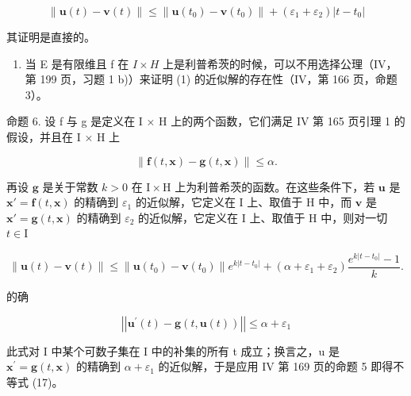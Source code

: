 \[
\left\| \mathbf {u} (t) - \mathbf {v} (t) \right\| \leqslant \left\| \mathbf {u} \left(t _ {0}\right) - \mathbf {v} \left(t _ {0}\right) \right\| + \left(\varepsilon_ {1} + \varepsilon_ {2}\right) | t - t _ {0} |
\]

其证明是直接的。

\begin{enumerate}
\def\labelenumi{\arabic{enumi})}
\setcounter{enumi}{1}
\tightlist
\item
  当 E 是有限维且 f 在 \(I \times H\) 上是利普希茨的时候，可以不用选择公理（IV，第 199 页，习题 1 b)）来证明 (1) 的近似解的存在性（IV，第 166 页，命题 3）。
\end{enumerate}

命题 6. 设 f 与 g 是定义在 I × H 上的两个函数，它们满足 IV 第 165 页引理 1 的假设，并且在 I × H 上

\[
\left\| \mathbf {f} (t, \mathbf {x}) - \mathbf {g} (t, \mathbf {x}) \right\| \leqslant \alpha .\tag{16}
\]

再设 \(\mathbf{g}\) 是关于常数 \(k > 0\) 在 \(\mathrm{I} \times \mathrm{H}\) 上为利普希茨的函数。在这些条件下，若 \(\mathbf{u}\) 是 \(\mathbf{x}' = \mathbf{f}(t, \mathbf{x})\) 的精确到 \(\varepsilon_1\) 的近似解，它定义在 \(\mathrm{I}\) 上、取值于 \(\mathrm{H}\) 中，而 \(\mathbf{v}\) 是 \(\mathbf{x}' = \mathbf{g}(t, \mathbf{x})\) 的精确到 \(\varepsilon_2\) 的近似解，它定义在 \(\mathrm{I}\) 上、取值于 \(\mathrm{H}\) 中，则对一切 \(t \in \mathrm{I}\)

\[
\| \mathbf {u} (t) - \mathbf {v} (t) \| \leqslant \| \mathbf {u} (t _ {0}) - \mathbf {v} (t _ {0}) \| e ^ {k | t - t _ {0} |} + (\alpha + \varepsilon_ {1} + \varepsilon_ {2}) \frac {e ^ {k | t - t _ {0} |} - 1}{k}.\tag{17}
\]

的确

\[
\left| \left| \mathbf {u} ^ {\prime} (t) - \mathbf {g} (t, \mathbf {u} (t)) \right| \right| \leqslant \alpha + \varepsilon_ {1}
\]

此式对 I 中某个可数子集在 I 中的补集的所有 t 成立；换言之，u 是 \(\mathbf{x}^{\prime} = \mathbf{g}(t, \mathbf{x})\) 的精确到 \(\alpha + \varepsilon_{1}\) 的近似解，于是应用 IV 第 169 页的命题 5 即得不等式 (17)。

